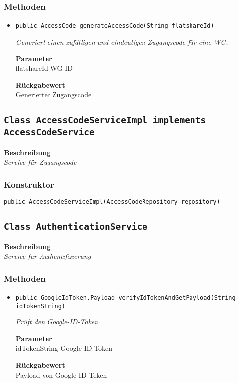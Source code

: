     \subsubsection{Methoden}
    \begin{itemize}
    	\item{\texttt{public AccessCode generateAccessCode(String flatshareId)}}
    	
    	\textit{Generiert einen zufälligen und eindeutigen Zugangscode für eine WG.}
    	
    	\textbf{Parameter} \\
    	flatshareId WG-ID
    	
    	\textbf{Rückgabewert} \\
    	Generierter Zugangscode
    \end{itemize}
    \subsection{\texttt{Class AccessCodeServiceImpl implements AccessCodeService}}
    \textbf{Beschreibung} \\
    \textit{Service für Zugangscode}
    \subsubsection{Konstruktor}
    \texttt{public AccessCodeServiceImpl(AccessCodeRepository repository)}
    \subsection{\texttt{Class AuthenticationService}}
    \textbf{Beschreibung} \\
    \textit{Service für Authentifizierung}
    \subsubsection{Methoden}
    \begin{itemize}
    	\item{\texttt{public GoogleIdToken.Payload verifyIdTokenAndGetPayload(String idTokenString)}}
    	
    	\textit{Prüft den Google-ID-Token.}
    	
    	\textbf{Parameter} \\
    	idTokenString Google-ID-Token
    	
    	\textbf{Rückgabewert} \\
    	Payload von Google-ID-Token
    \end{itemize}
